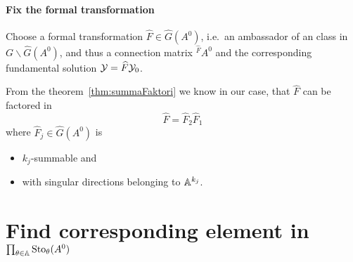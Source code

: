 \paragraph{Fix the formal transformation}
Choose a formal transformation $\hat F\in\hat G(A^0)$, i.e.\ an ambassador of
an class in $G\backslash\hat G(A^0)$, and thus a connection matrix
${}^{\hat F}\!A^0$ and the corresponding fundamental solution
$\mathcal{Y}=\widehat F\mathcal{Y}_0$.

From the theorem~\ref{thm:summaFaktori} we know in our case, that $\hat F$ can
be factored in
\[
  \hat F=\hat F_2 \hat F_1
\]
where $\hat F_j\in\hat G(A^0)$ is
\begin{itemize}
  \item $k_j$-summable and
  \item with singular directions belonging to $\mathbb{A}^{k_j}$.
\end{itemize}

\section{Find corresponding element in $\prod_{\theta\in\mathbb{A}}\operatorname{Sto}_\theta(A^0)$}
\begin{comment}
  needs \textbf{summability}?
  \begin{itemize}
    \item \cite[9]{thboalch} (only mentions multisummability)
    \item \cite[III.2]{Loday1994}
    \item \cite{Loday2014}
  \end{itemize}
\end{comment}

